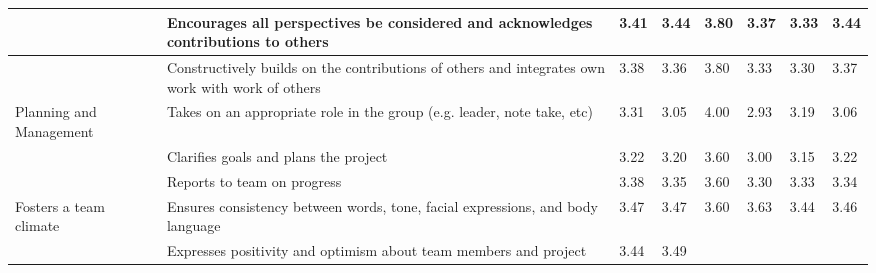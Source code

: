 \documentclass[sigconf, anonymous=true]{acmart}
\begin{document}
\begin{table*}[ht]
\begin{tabular} {| p{2cm} | p{7cm} | p{1cm}| p{1cm} | p{1cm}| p{1cm} |p{1cm} |p{1cm} |}
		\hline
		& Encourages all perspectives be considered and acknowledges contributions to others               &
  	     3.41 &
  	     3.44 &		
		 3.80                                                     & 3.37                                                 & 3.33                                                 & 3.44                                               \\
		\hline
		& Constructively builds on the contributions of others and integrates own work with work of others &
		 3.38 &
		 3.36 &
		 3.80                                                     & 3.33                                                 & 3.30                                                 & 3.37                                               \\
		\hline
		Planning and Management             & Takes on an appropriate role in the group (e.g. leader, note take, etc)                          &
		 3.31 &
		 3.05 &
		 4.00                                                       & 2.93                                                 & 3.19                                                 & 3.06                                               \\
		\hline
		& Clarifies goals and plans the project                                                            &
		3.22 &
		3.20 & 
		3.60                                                     & 3.00                                                     & 3.15                                                 & 3.22                                               \\
		\hline
		& Reports to team on progress                                                                      & 
		3.38 &
		3.35 &
		3.60                                                     & 3.30                                                 & 3.33                                                 & 3.34                                               \\
		\hline
		Fosters a team climate              & Ensures consistency between words, tone, facial expressions, and body language                   &
		3.47 &
		3.47 &
		 3.60                                                     & 3.63                                                 & 3.44                                                 & 3.46                                               \\
		\hline
		& Expresses positivity and optimism about team members and project                                 &
		3.44 &
		3.49 &

\end{tabular}
\end{table*}
\end{document}
